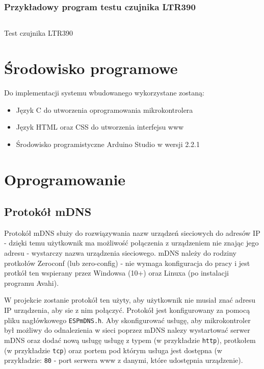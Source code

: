 \documentclass[12pt,a4paper]{article}
\begin{document}
\subsubsection{Przykładowy program testu czujnika LTR390}
\begin{code}[H]
\inputminted[frame=lines,baselinestretch=1,breaklines,linenos,xleftmargin=1.5em]{c}{../proj/ltr390-test/ltr390-test.ino}

\caption{Test czujnika LTR390}
\end{code}

\section{Środowisko programowe}
Do implementacji systemu wbudowanego wykorzystane zostaną:
\begin{itemize}
    \item Język C do utworzenia oprogramowania mikrokontrolera
    \item Język HTML oraz CSS do utworzenia interfejsu www
    \item Środowisko programistyczne Arduino Studio w wersji 2.2.1
\end{itemize}

\section{Oprogramowanie}

\subsection{Protokół mDNS}

Protokół mDNS służy do rozwiązywania nazw urządzeń sieciowych do adresów IP - dzięki temu użytkownik ma możliwość połączenia z urządzeniem nie znając
jego adresu - wystarczy nazwa urządzenia sieciowego. mDNS należy do rodziny protkołów Zeroconf (lub zero-config)\cite{zeroconf-explanation} - nie wymaga konfiguracja do pracy 
i jest protkół ten wspierany przez Windowsa (10+) oraz Linuxa (po instalacji programu Avahi).

W projekcie zostanie protokół ten użyty, aby użytkownik nie musiał znać adresu IP urządzenia, aby sie z nim połączyć. 
Protokół jest konfigurowany za pomocą pliku nagłówkowego \texttt{ESPmDNS.h}. Aby skonfigurować usługę, aby mikrokontroler był możliwy do odnalezienia
w sieci poprzez mDNS nalezy wystartować serwer mDNS oraz dodać nową usługę usługę z typem (w przykładzie \texttt{http}), protkołem (w przykładzie \texttt{tcp}) 
oraz portem pod którym usługa jest dostępna (w przykładzie: \texttt{80} - port serwera www z danymi, które udostępnia urządzenie).
\end{document}
